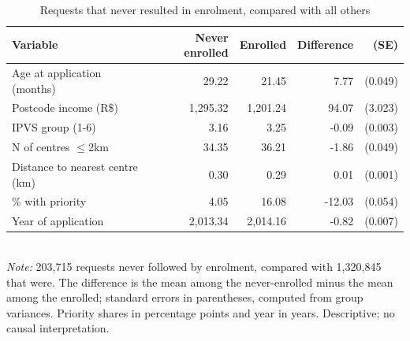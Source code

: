 \begin{table}[htbp]\centering
\caption{Requests that never resulted in enrolment, compared with all others}
\label{tab:T4d_never}
\small
\setlength{\tabcolsep}{4pt}
\begin{tabular}{lrrrr}
\toprule
Variable & Never enrolled & Enrolled & Difference & (SE) \\
\midrule
Age at application (months) & 29.22 & 21.45 & 7.77 & (0.049) \\
Postcode income (R\$) & 1,295.32 & 1,201.24 & 94.07 & (3.023) \\
IPVS group (1-6) & 3.16 & 3.25 & -0.09 & (0.003) \\
N of centres $\leq$2km & 34.35 & 36.21 & -1.86 & (0.049) \\
Distance to nearest centre (km) & 0.30 & 0.29 & 0.01 & (0.001) \\
\% with priority & 4.05 & 16.08 & -12.03 & (0.054) \\
Year of application & 2,013.34 & 2,014.16 & -0.82 & (0.007) \\
\bottomrule
\end{tabular}
\\[3pt]{\footnotesize \textit{Note:} 203,715 requests never followed by enrolment, compared with 1,320,845 that were. The difference is the mean among the never-enrolled minus the mean among the enrolled; standard errors in parentheses, computed from group variances. Priority shares in percentage points and year in years. Descriptive; no causal interpretation.}
\end{table}
